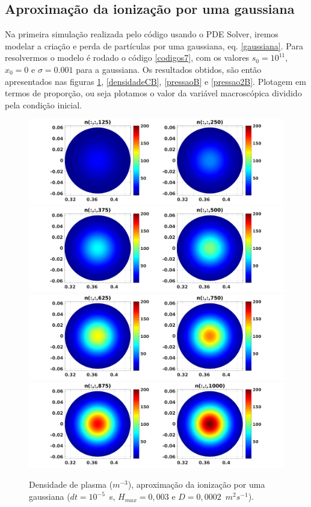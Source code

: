 \documentclass[12pt,oneside,a4paper]{abntex2}
\begin{document}
\subsection{Aproximação da ionização por uma gaussiana}
\label{pdesolvergauss}
\noindent Na primeira simulação realizada pelo código usando o PDE Solver, iremos modelar a criação e perda de partículas por uma gaussiana, eq. \ref{gaussiana}. %
Para resolvermos o modelo é rodado o código \ref{codigos7}, com os valores $s_0=10^{11}$, $x_0=0$ e $\sigma=0.001$ para a gaussiana. 
Os resultados obtidos, são então apresentados nas figuras \ref{densidadeB}, \ref{densidadeCB}, \ref{pressaoB} e \ref{pressao2B}. 
Plotagem em termos de proporção, ou seja plotamos o valor da variável macroscópica dividido pela condição inicial.
\begin{figure}[H]
\centering
\includegraphics[scale=0.5]{../SImulacao_breakdown/PDE/ntod1B6.png}  
\includegraphics[scale=0.5]{../SImulacao_breakdown/PDE/ntod2B6.png} 
\includegraphics[scale=0.5]{../SImulacao_breakdown/PDE/ntod3B6.png} 
\includegraphics[scale=0.5]{../SImulacao_breakdown/PDE/ntod4B6.png} 
\caption{Densidade de plasma ($m^{-3}$), aproximação da ionização por uma gaussiana ($dt=10^{-5}$\ s, $H_{max} = 0,003$ e $D=0,0002$\ $m^2s^{-1}$).}
\label{densidadeB}
\end{figure}
\end{document}
